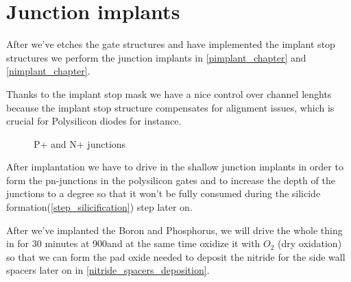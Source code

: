 \section{Junction implants}\label{junctions_chapter}

After we've etches the gate structures and have implemented the implant stop structures we perform the junction implants in \autoref{pimplant_chapter} and \autoref{nimplant_chapter}.

Thanks to the implant stop mask we have a nice control over channel lenghts because the implant stop structure compensates for alignment issues, which is crucial for Polysilicon diodes for instance.

\begin{figure}[H]
	\centering
	\begin{tikzpicture}[node distance = 3cm, auto, thick,scale=\CrossAndTopSectionBig, every node/.style={transform shape}]
		
	\end{tikzpicture}
	\caption{P+ and N+ junctions}
\end{figure}

After implantation we have to drive in the shallow junction implants in order to form the pn-junctions in the polysilicon gates and to increase the depth of the junctions
to a degree so that it won't be fully consumed during the silicide formation(\autoref{step_silicification}) step later on.

After we've implanted the Boron and Phosphorus, we will drive the whole thing in for 30 minutes at 900\degreesC and at the same time oxidize it with $O_2$ (dry oxidation) so that we can form the pad
oxide needed to deposit the nitride for the side wall spacers later on in \autoref{nitride_spacers_deposition}.

\newpage


